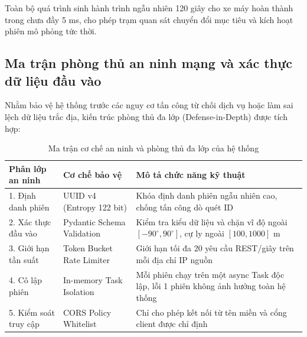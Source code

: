 \begin{table}[H]
\centering
\caption{Thời gian thực thi của các thao tác giải thuật trên đồ thị mạng đường 337K nút}
\label{tab:graph-operations-timing}
\end{table}

Toàn bộ quá trình sinh hành trình ngẫu nhiên 120 giây cho xe máy hoàn thành trong chưa đầy 5 ms, cho phép trạm quan sát chuyển đổi mục tiêu và kích hoạt phiên mô phỏng tức thời.

\subsection{Ma trận phòng thủ an ninh mạng và xác thực dữ liệu đầu vào}

\hspace{0.5cm} Nhằm bảo vệ hệ thống trước các nguy cơ tấn công từ chối dịch vụ hoặc làm sai lệch dữ liệu trắc địa, kiến trúc phòng thủ đa lớp (Defense-in-Depth) được tích hợp:

\begin{table}[H]
\centering
\caption{Ma trận cơ chế an ninh và phòng thủ đa lớp của hệ thống}
\label{tab:security-mechanisms-matrix}
\begin{tabularx}{\linewidth}{ll>{\RaggedRight}X}
\toprule
\textbf{Phân lớp an ninh} & \textbf{Cơ chế bảo vệ} & \textbf{Mô tả chức năng kỹ thuật} \\
\midrule
1. Định danh phiên & UUID v4 (Entropy 122 bit) & Khóa định danh phiên ngẫu nhiên cao, chống tấn công dò quét ID \\
2. Xác thực đầu vào & Pydantic Schema Validation & Kiểm tra kiểu dữ liệu và chặn vĩ độ ngoài $[-90^\circ, 90^\circ]$, cự ly ngoài $[100, 1000]$ m \\
3. Giới hạn tần suất & Token Bucket Rate Limiter & Giới hạn tối đa 20 yêu cầu REST/giây trên mỗi địa chỉ IP nguồn \\
4. Cô lập phiên & In-memory Task Isolation & Mỗi phiên chạy trên một async Task độc lập, lỗi 1 phiên không ảnh hưởng toàn hệ thống \\
5. Kiểm soát truy cập & CORS Policy Whitelist & Chỉ cho phép kết nối từ tên miền và cổng client được chỉ định \\
\bottomrule
\end{tabularx}
\end{table}

